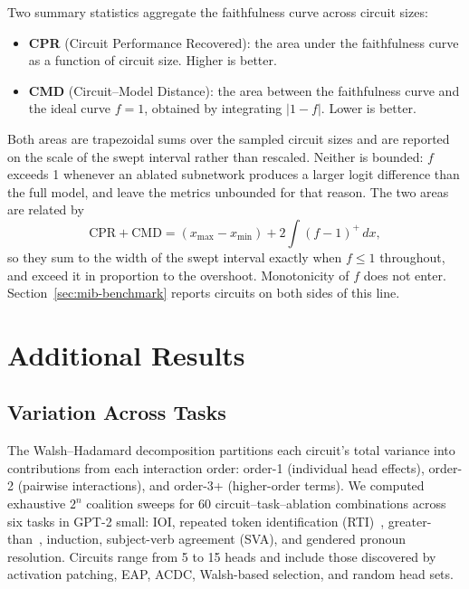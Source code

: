 \documentclass{article}
\begin{document}
Two summary statistics aggregate the faithfulness curve across circuit
sizes:

\begin{itemize}
\item \textbf{CPR} (Circuit Performance Recovered): the area under the
  faithfulness curve as a function of circuit size. Higher is better.

\item \textbf{CMD} (Circuit--Model Distance): the area between the
  faithfulness curve and the ideal curve $f = 1$, obtained by integrating
  $|1 - f|$. Lower is better.
\end{itemize}

Both areas are trapezoidal sums over the sampled circuit sizes and are
reported on the scale of the swept interval rather than rescaled.
Neither is bounded: $f$ exceeds 1 whenever an ablated subnetwork produces
a larger logit difference than the full model, and \citet{mueller2025mib}
leave the metrics unbounded for that reason. The two areas are related by
\begin{equation}
  \text{CPR} + \text{CMD} = (x_{\max} - x_{\min}) + 2\int (f - 1)^{+}\,dx,
  \label{eq:cpr-cmd}
\end{equation}
so they sum to the width of the swept interval exactly when $f \le 1$
throughout, and exceed it in proportion to the overshoot. Monotonicity of
$f$ does not enter. Section~\ref{sec:mib-benchmark} reports circuits on
both sides of this line.


\section{Additional Results}
\label{app:additional}


\subsection{Variation Across Tasks}
\label{sec:energy-spectrum}

The Walsh--Hadamard decomposition partitions each circuit's total
variance into contributions from each interaction order: order-1
(individual head effects), order-2 (pairwise interactions), and
order-3+ (higher-order terms). We computed exhaustive $2^n$ coalition
sweeps for 60 circuit--task--ablation combinations across six tasks in
GPT-2 small: IOI, repeated token identification
(RTI)~\citep{tower2025rti}, greater-than~\citep{hanna2023greater},
induction, subject-verb agreement (SVA), and gendered pronoun
resolution. Circuits range from 5 to 15 heads and include those
discovered by activation patching, EAP, ACDC, Walsh-based selection,
and random head sets.
\end{document}
